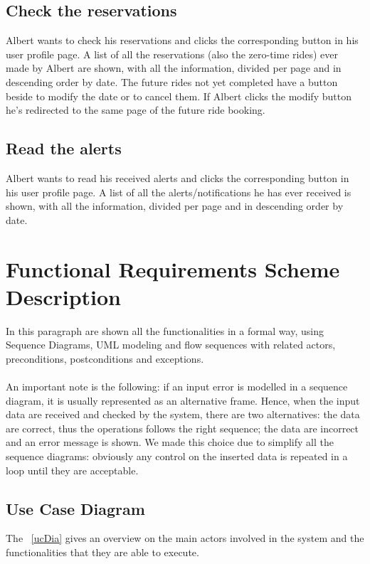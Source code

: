 \subsection{Check the reservations}
Albert wants to check his \glspl{reservation} and clicks the corresponding button in his user profile page. A list of all the \glspl{reservation} (also the zero-time rides) ever made by Albert are shown, with all the information, divided per page and in descending order by date. The \gls{future} rides not yet completed have a button beside to modify the date or to cancel them. If Albert clicks the modify button he's redirected to the same page of the \gls{future} ride booking.

\subsection{Read the alerts}
Albert wants to read his received \glspl{alert} and clicks the corresponding button in his user profile page. A list of all the \glspl{alert}/notifications he has ever received is shown, with all the information, divided per page and in descending order by date.



\section{Functional Requirements Scheme Description}
In this paragraph are shown all the functionalities in a formal way, using Sequence Diagrams, UML modeling and flow sequences with related actors, preconditions, postconditions and exceptions.\\
\\
An important note is the following: if an input error is modelled in a sequence diagram, it is usually represented as an alternative frame. Hence, when the input data are received and checked by the system, there are two alternatives: the data are correct, thus the operations follows the right sequence; the data are incorrect and an error message is shown. We made this choice due to simplify all the sequence diagrams: obviously any control on the inserted data is repeated in a loop until they are acceptable.


\subsection{Use Case Diagram}
The \figurename~\ref{ucDia} gives an overview on the main actors involved in the system and the functionalities that they are able to execute.

